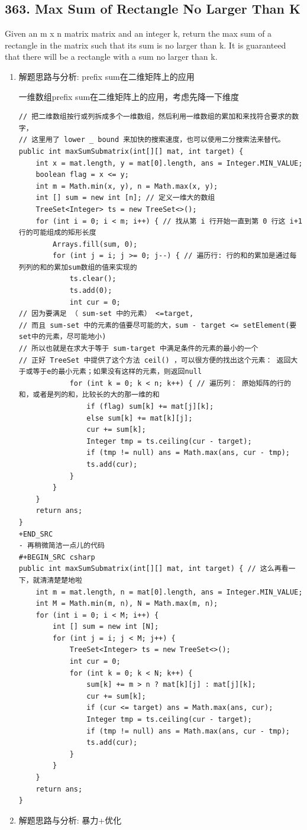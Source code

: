\documentclass[9pt, b5paaper]{book}
\begin{document}
\subsection{363. Max Sum of Rectangle No Larger Than K}
\label{sec-1-4-47}
Given an m x n matrix matrix and an integer k, return the max sum of a rectangle in the matrix such that its sum is no larger than k.
It is guaranteed that there will be a rectangle with a sum no larger than k.
\begin{enumerate}
\item 解题思路与分析: prefix sum在二维矩阵上的应用
\label{sec-1-4-47-1}

一维数组prefix sum在二维矩阵上的应用，考虑先降一下维度

\begin{verbatim}
// 把二维数组按行或列拆成多个一维数组，然后利用一维数组的累加和来找符合要求的数字，
// 这里用了 lower _ bound 来加快的搜索速度，也可以使用二分搜索法来替代。
public int maxSumSubmatrix(int[][] mat, int target) {
    int x = mat.length, y = mat[0].length, ans = Integer.MIN_VALUE;
    boolean flag = x <= y;
    int m = Math.min(x, y), n = Math.max(x, y);
    int [] sum = new int [n]; // 定义一维大的数组
    TreeSet<Integer> ts = new TreeSet<>();
    for (int i = 0; i < m; i++) { // 找从第 i 行开始一直到第 0 行这 i+1 行的可能组成的矩形长度
        Arrays.fill(sum, 0);
        for (int j = i; j >= 0; j--) { // 遍历行: 行的和的累加是通过每列列的和的累加sum数组的值来实现的
            ts.clear();
            ts.add(0);
            int cur = 0;
// 因为要满足 （ sum-set 中的元素） <=target,
// 而且 sum-set 中的元素的值要尽可能的大，sum - target <= setElement(要set中的元素，尽可能地小)
// 所以也就是在求大于等于 sum-target 中满足条件的元素的最小的一个
// 正好 TreeSet 中提供了这个方法 ceil() ，可以很方便的找出这个元素： 返回大于或等于e的最小元素；如果没有这样的元素，则返回null
            for (int k = 0; k < n; k++) { // 遍历列： 原始矩阵的行的和，或者是列的和，比较长的大的那一维的和
                if (flag) sum[k] += mat[j][k];
                else sum[k] += mat[k][j];
                cur += sum[k];
                Integer tmp = ts.ceiling(cur - target);
                if (tmp != null) ans = Math.max(ans, cur - tmp);
                ts.add(cur);
            }
        }
    }
    return ans;
}
+END_SRC
- 再稍微简洁一点儿的代码
#+BEGIN_SRC csharp
public int maxSumSubmatrix(int[][] mat, int target) { // 这么再看一下，就清清楚楚地啦
    int m = mat.length, n = mat[0].length, ans = Integer.MIN_VALUE;
    int M = Math.min(m, n), N = Math.max(m, n);
    for (int i = 0; i < M; i++) {
        int [] sum = new int [N];
        for (int j = i; j < M; j++) {
            TreeSet<Integer> ts = new TreeSet<>();
            int cur = 0;
            for (int k = 0; k < N; k++) {
                sum[k] += m > n ? mat[k][j] : mat[j][k];
                cur += sum[k];
                if (cur <= target) ans = Math.max(ans, cur);
                Integer tmp = ts.ceiling(cur - target);
                if (tmp != null) ans = Math.max(ans, cur - tmp);
                ts.add(cur);
            }
        }
    }
    return ans;
}
\end{verbatim}
\item 解题思路与分析: 暴力+优化
\label{sec-1-4-47-2}


\end{enumerate}
\end{document}
